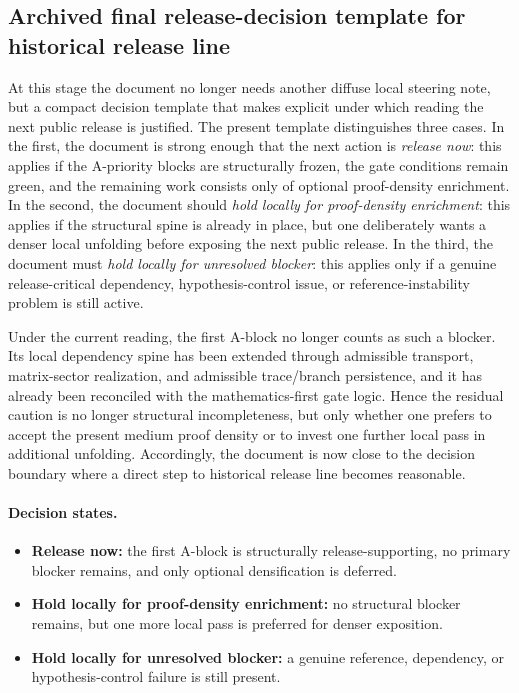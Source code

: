 \documentclass[12pt,a4paper]{article}
\DeclareRobustCommand{\QSCver}[1]{archival stage}
\renewcommand{\QSCver}[1]{historical release line}
\begin{document}
\subsection*{Archived final release-decision template for \QSCver{v2.27.0}}
At this stage the document no longer needs another diffuse local steering note, but a compact decision template that makes explicit under which reading the next public release is justified. The present template distinguishes three cases. In the first, the document is strong enough that the next action is \emph{release now}: this applies if the A-priority blocks are structurally frozen, the gate conditions remain green, and the remaining work consists only of optional proof-density enrichment. In the second, the document should \emph{hold locally for proof-density enrichment}: this applies if the structural spine is already in place, but one deliberately wants a denser local unfolding before exposing the next public release. In the third, the document must \emph{hold locally for unresolved blocker}: this applies only if a genuine release-critical dependency, hypothesis-control issue, or reference-instability problem is still active.

Under the current reading, the first A-block no longer counts as such a blocker. Its local dependency spine has been extended through admissible transport, matrix-sector realization, and admissible trace/branch persistence, and it has already been reconciled with the mathematics-first gate logic. Hence the residual caution is no longer structural incompleteness, but only whether one prefers to accept the present medium proof density or to invest one further local pass in additional unfolding. Accordingly, the document is now close to the decision boundary where a direct step to \QSCver{v2.27.0} becomes reasonable.

\paragraph{Decision states.}
\begin{itemize}[leftmargin=2em]
 \item \textbf{Release now:} the first A-block is structurally release-supporting, no primary blocker remains, and only optional densification is deferred.
 \item \textbf{Hold locally for proof-density enrichment:} no structural blocker remains, but one more local pass is preferred for denser exposition.
 \item \textbf{Hold locally for unresolved blocker:} a genuine reference, dependency, or hypothesis-control failure is still present.
\end{itemize}
\end{document}
